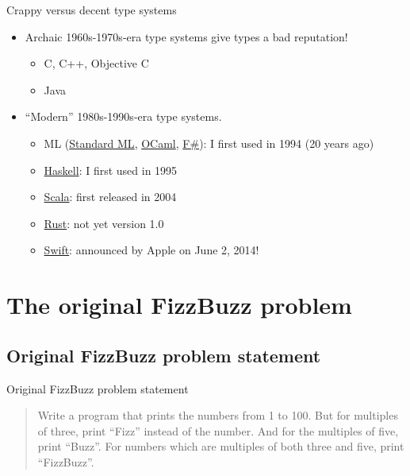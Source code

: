 \begin{frame}{Crappy versus decent type systems}
  \begin{itemize}
  \item Archaic \alert{1960s-1970s}-era type systems give types a bad reputation!
    \begin{itemize}
    \item C, C++, Objective C
    \item Java
    \end{itemize}
  \item ``Modern'' \alert{1980s-1990s}-era type systems.
    \begin{itemize}
    \item ML (\href{http://www.smlnj.org/}{Standard ML}, \href{http://ocaml.org/}{OCaml}, \href{http://fsharp.org/}{F\#}): I first used in 1994 (20 years ago)
    \item \href{http://www.haskell.org/}{Haskell}: I first used in 1995
    \item \href{http://www.scala-lang.org/}{Scala}: first released in 2004
    \item \href{http://www.rust-lang.org/}{Rust}: not yet version 1.0
    \item \href{http://developer.apple.com/swift/}{Swift}: announced by Apple on June 2, 2014!
    \end{itemize}
  \end{itemize}
\end{frame}

\section{The original FizzBuzz problem}

\subsection{Original FizzBuzz problem statement}

\begin{frame}{Original FizzBuzz problem statement}
  \begin{quotation}
Write a program that prints the numbers from 1 to 100. But for multiples of three, print ``Fizz'' instead of the number. And for the multiples of five, print ``Buzz''. For numbers which are multiples of both three and five, print ``FizzBuzz''.
  \end{quotation}
\end{frame}

